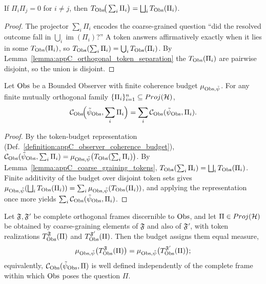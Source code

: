\begin{lemma}
\label{lemma:appC_coarse_graining_tokens}
If $\Pi_i \Pi_j = 0$ for $i \neq j$, then
$T_{\mathrm{Obs}}\!\big(\sum_i \Pi_i\big) = \bigsqcup_i T_{\mathrm{Obs}}(\Pi_i)$.
\end{lemma}

\begin{proof}
\label{proof:appC_coarse_graining_tokens}
The projector $\sum_i \Pi_i$ encodes the coarse-grained question
``did the resolved outcome fall in $\bigcup_i \operatorname{im}(\Pi_i)$?'' A token
answers affirmatively exactly when it lies in some $T_{\mathrm{Obs}}(\Pi_i)$, so
$T_{\mathrm{Obs}}(\sum_i \Pi_i) = \bigcup_i T_{\mathrm{Obs}}(\Pi_i)$. By
Lemma~\ref{lemma:appC_orthogonal_token_separation} the $T_{\mathrm{Obs}}(\Pi_i)$ are pairwise
disjoint, so the union is disjoint.
\end{proof}

\begin{theorem}
\label{theorem:appC_orthogonal_additivity}
Let $\mathrm{Obs}$ be a Bounded Observer with finite coherence budget
$\mu_{\mathrm{Obs},\tilde\psi}$. For any finite mutually orthogonal family
$\{\Pi_i\}_{i=1}^n \subseteq Proj(\mathcal{H})$,
\[
\mathcal{C}_{\mathrm{Obs}}\!\Big(\tilde\psi_{\mathrm{Obs}}, \sum_i \Pi_i\Big)
= \sum_i \mathcal{C}_{\mathrm{Obs}}(\tilde\psi_{\mathrm{Obs}}, \Pi_i).
\]
\end{theorem}

\begin{proof}
\label{proof:appC_orthogonal_additivity}
By the token-budget representation (Def.~\ref{definition:appC_observer_coherence_budget}),
$\mathcal{C}_{\mathrm{Obs}}(\tilde\psi_{\mathrm{Obs}}, \sum_i \Pi_i)
= \mu_{\mathrm{Obs},\tilde\psi}\big(T_{\mathrm{Obs}}(\sum_i \Pi_i)\big)$. By
Lemma~\ref{lemma:appC_coarse_graining_tokens},
$T_{\mathrm{Obs}}(\sum_i \Pi_i) = \bigsqcup_i T_{\mathrm{Obs}}(\Pi_i)$. Finite additivity of the budget
over disjoint token sets gives
$\mu_{\mathrm{Obs},\tilde\psi}(\bigsqcup_i T_{\mathrm{Obs}}(\Pi_i))
= \sum_i \mu_{\mathrm{Obs},\tilde\psi}(T_{\mathrm{Obs}}(\Pi_i))$, and applying the representation once
more yields $\sum_i \mathcal{C}_{\mathrm{Obs}}(\tilde\psi_{\mathrm{Obs}}, \Pi_i)$.
\end{proof}

\begin{axiom}
\label{axiom:appC_psc3prime}
Let $\mathfrak{F}, \mathfrak{F}'$ be complete orthogonal frames discernible to $\mathrm{Obs}$,
and let $\Pi \in Proj(\mathcal{H})$ be obtained by coarse-graining elements of
$\mathfrak{F}$ and also of $\mathfrak{F}'$, with token realizations
$T^{\mathfrak{F}}_{\mathrm{Obs}}(\Pi)$ and $T^{\mathfrak{F}'}_{\mathrm{Obs}}(\Pi)$. Then the budget
assigns them equal measure,
\[
\mu_{\mathrm{Obs},\tilde\psi}\big(T^{\mathfrak{F}}_{\mathrm{Obs}}(\Pi)\big)
= \mu_{\mathrm{Obs},\tilde\psi}\big(T^{\mathfrak{F}'}_{\mathrm{Obs}}(\Pi)\big);
\]
equivalently, $\mathcal{C}_{\mathrm{Obs}}(\tilde\psi_{\mathrm{Obs}},\Pi)$ is well defined independently of
the complete frame within which $\mathrm{Obs}$ poses the question $\Pi$.
\end{axiom}


